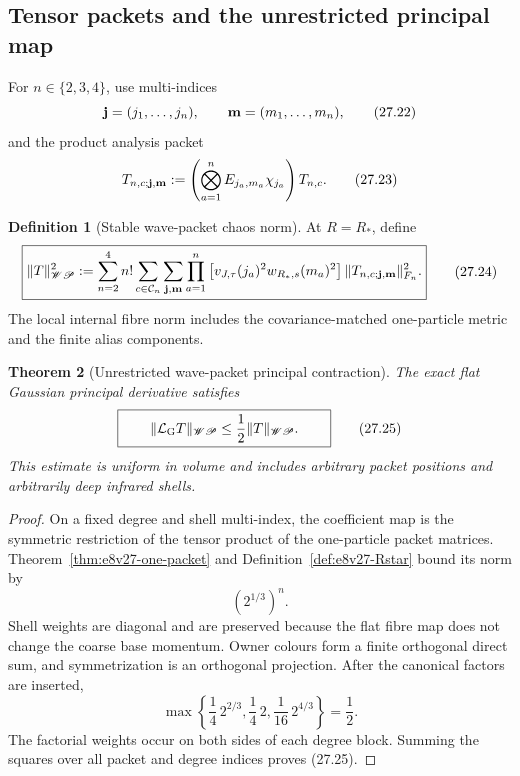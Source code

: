 \documentclass[11pt,oneside]{book}
\newtheorem{theorem}{Theorem}[chapter]
\theoremstyle{definition}
\newtheorem{definition}[theorem]{Definition}
\theoremstyle{remark}
\begin{document}
\subsection{Tensor packets and the unrestricted principal map}

For \(n\in\{2,3,4\}\), use multi-indices
\[
 {\bf j}=(j_1,\ldots,j_n),\qquad
 {\bf m}=(m_1,\ldots,m_n),                                       \tag{27.22}
\]
and the product analysis packet
\[
 T_{n,c;{\bf j},{\bf m}}
 :=
 \left(\bigotimes_{a=1}^nE_{j_a,m_a}\chi_{j_a}\right)T_{n,c}.     \tag{27.23}
\]

\begin{definition}[Stable wave-packet chaos norm]
\label{def:e8v27-chaos-norm}
At \(R=R_*\), define
\[
\boxed{
\begin{split}
 \|T\|_{\mathscr{WP}}^2
 :=\sum_{n=2}^4 n!
 \sum_{c\in{\cal C}_n}
 \sum_{{\bf j},{\bf m}}
 \prod_{a=1}^n
 \left[v_{J,\tau}(j_a)^2w_{R_*,s}(m_a)^2\right]
 \|T_{n,c;{\bf j},{\bf m}}\|_{F_n}^2.
\end{split}}                                                     \tag{27.24}
\]
The local internal fibre norm includes the covariance-matched
one-particle metric and the finite alias components.
\end{definition}

\begin{theorem}[Unrestricted wave-packet principal contraction]
\label{thm:e8v27-principal}
The exact flat Gaussian principal derivative satisfies
\[
\boxed{\qquad
                     \|\mathcal L_{\rm G}T\|_{\mathscr{WP}}
                     \leq\frac12\|T\|_{\mathscr{WP}}.
\qquad}                                                           \tag{27.25}
\]
This estimate is uniform in volume and includes arbitrary packet
positions and arbitrarily deep infrared shells.
\end{theorem}

\begin{proof}
On a fixed degree and shell multi-index, the coefficient map is the
symmetric restriction of the tensor product of the one-particle
packet matrices.  Theorem~\ref{thm:e8v27-one-packet} and
Definition~\ref{def:e8v27-Rstar} bound its norm by
\[
                         (2^{1/3})^n.                             \tag{27.26}
\]
Shell weights are diagonal and are preserved because the flat fibre
map does not change the coarse base momentum.  Owner colours form a
finite orthogonal direct sum, and symmetrization is an orthogonal
projection.  After the canonical factors are inserted,
\[
 \max\left\{
 \frac14\,2^{2/3},
 \frac14\,2,
 \frac1{16}\,2^{4/3}
 \right\}=\frac12.                                                \tag{27.27}
\]
The factorial weights occur on both sides of each degree block.
Summing the squares over all packet and degree indices proves
(27.25).
\end{proof}
\end{document}
